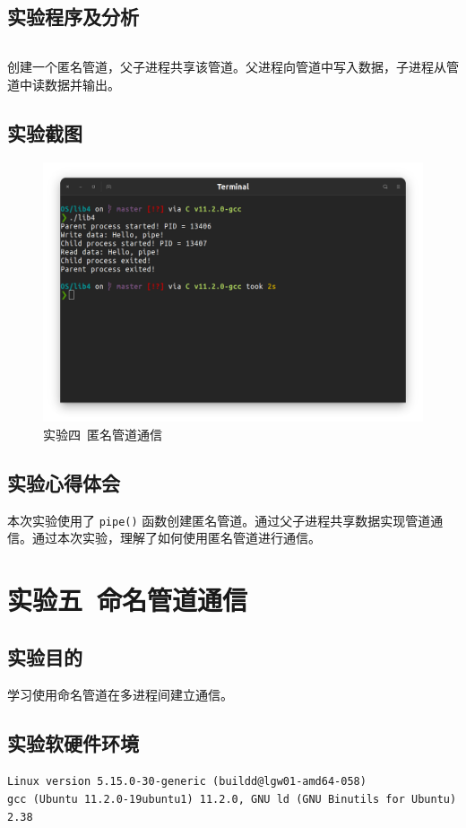 \documentclass{article}
\begin{document}
		\subsection{实验程序及分析}
			\inputminted[linenos,breaklines,tabsize=4]{c}{lib4/lib4.c}

			创建一个匿名管道，父子进程共享该管道。父进程向管道中写入数据，子进程从管道中读数据并输出。

		\subsection{实验截图}
			\begin{figure}[htbp]
				\centering
				\includegraphics[width=\textwidth]{lib4/Screenshot.png}
				\caption{实验四\ 匿名管道通信}
			\end{figure}

		\subsection{实验心得体会}
			本次实验使用了 \texttt{pipe()} 函数创建匿名管道。通过父子进程共享数据实现管道通信。通过本次实验，理解了如何使用匿名管道进行通信。

	\section{实验五\ 命名管道通信}
		\subsection{实验目的}
			学习使用命名管道在多进程间建立通信。

		\subsection{实验软硬件环境}
			\texttt{Linux version 5.15.0-30-generic (buildd@lgw01-amd64-058) \\ gcc (Ubuntu 11.2.0-19ubuntu1) 11.2.0, GNU ld (GNU Binutils for Ubuntu) 2.38}
\end{document}
